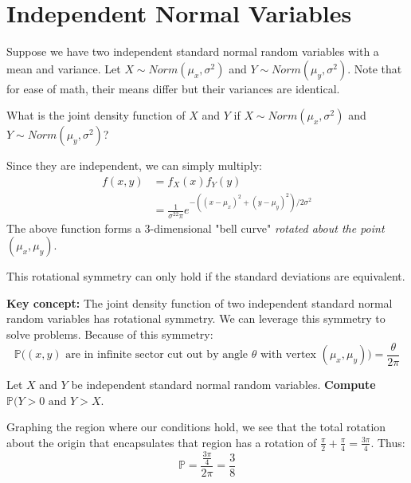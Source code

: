 \documentclass[titlepage, 12pt, leqno]{article}
\begin{document}
\section{Independent Normal Variables}
Suppose we have two independent standard normal random variables with a mean and
variance. Let $X \sim Norm(\mu_x, \sigma^2)$ and $Y \sim Norm(\mu_y, \sigma^2)$.
Note that for ease of math, their means differ but their variances are identical.

\begin{ex}
    What is the joint density function of $X$ and $Y$ if $X \sim Norm(\mu_x, 
    \sigma^2)$ and $Y \sim Norm(\mu_y, \sigma^2)$?
    \vspace{10px}
    
    Since they are independent, we can simply multiply:
    \begin{align*}
        f(x,y) &= f_X(x)f_Y(y) \\
               &= \frac{1}{\sigma^22\pi }e^
               {-((x-\mu_x)^2 + (y-\mu_y)^2)/2\sigma^2}
    \end{align*}
    The above function forms a 3-dimensional "bell curve" \textit{rotated about
    the point $(\mu_x, \mu_y)$}.
    \begin{note}
        This rotational symmetry can only hold if the standard deviations are
        equivalent.
    \end{note}
\end{ex}

\textbf{Key concept:} The joint density function of two independent standard
normal random variables has rotational symmetry. We can leverage this symmetry to
solve problems. Because of this symmetry:
\[
\boxed{
    \mathbb{P}((x,y) \text{ are in infinite sector cut out by angle $\theta$ with
    vertex $(\mu_x, \mu_y)$)} = \frac{\theta}{2\pi }
}
\]
\begin{ex}
    Let $X$ and $Y$ be independent standard normal random variables. \textbf{
    Compute $\mathbb{P}(Y>0 \text{ and } Y>X$}.
    \vspace{10px}
    
    Graphing the region where our conditions hold, we see that the total rotation
    about the origin that encapsulates that region has a rotation of 
    $\frac{\pi }{2} + \frac{\pi }{4} = \frac{3\pi }{4}$. Thus:
    \[
        \mathbb{P} = \frac{\frac{3\pi }{4}}{2\pi } = \boxed{\frac{3}{8}}
    \]
\end{ex}

\pagebreak
\end{document}
